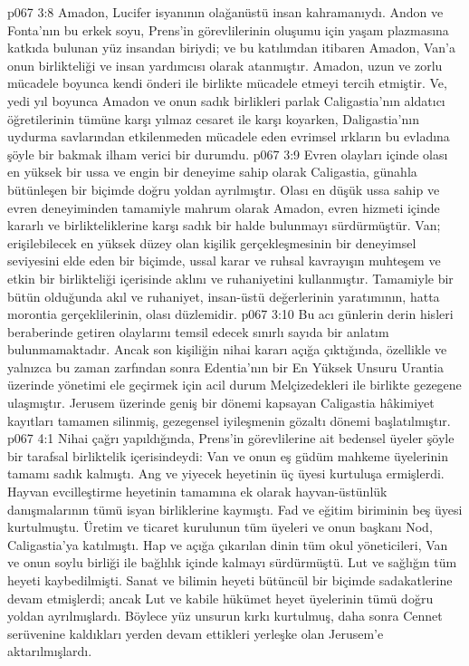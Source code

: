\vs p067 3:8 Amadon, Lucifer isyanının olağanüstü insan kahramanıydı. Andon ve Fonta’nın bu erkek soyu, Prens’in görevlilerinin oluşumu için yaşam plazmasına katkıda bulunan yüz insandan biriydi; ve bu katılımdan itibaren Amadon, Van’a onun birlikteliği ve insan yardımcısı olarak atanmıştır. Amadon, uzun ve zorlu mücadele boyunca kendi önderi ile birlikte mücadele etmeyi tercih etmiştir. Ve, yedi yıl boyunca Amadon ve onun sadık birlikleri parlak Caligastia’nın aldatıcı öğretilerinin tümüne karşı yılmaz cesaret ile karşı koyarken, Daligastia’nın uydurma savlarından etkilenmeden mücadele eden evrimsel ırkların bu evladına şöyle bir bakmak ilham verici bir durumdu.
\vs p067 3:9 Evren olayları içinde olası en yüksek bir ussa ve engin bir deneyime sahip olarak Caligastia, günahla bütünleşen bir biçimde doğru yoldan ayrılmıştır. Olası en düşük ussa sahip ve evren deneyiminden tamamiyle mahrum olarak Amadon, evren hizmeti içinde kararlı ve birlikteliklerine karşı sadık bir halde bulunmayı sürdürmüştür. Van; erişilebilecek en yüksek düzey olan kişilik gerçekleşmesinin bir deneyimsel seviyesini elde eden bir biçimde, ussal karar ve ruhsal kavrayışın muhteşem ve etkin bir birlikteliği içerisinde aklını ve ruhaniyetini kullanmıştır. Tamamiyle bir bütün olduğunda akıl ve ruhaniyet, insan\hyp{}üstü değerlerinin yaratımının, hatta morontia gerçeklilerinin, olası düzlemidir.
\vs p067 3:10 Bu acı günlerin derin hisleri beraberinde getiren olaylarını temsil edecek sınırlı sayıda bir anlatım bulunmamaktadır. Ancak son kişiliğin nihai kararı açığa çıktığında, özellikle ve yalnızca bu zaman zarfından sonra Edentia’nın bir En Yüksek Unsuru Urantia üzerinde yönetimi ele geçirmek için acil durum Melçizedekleri ile birlikte gezegene ulaşmıştır. Jerusem üzerinde geniş bir dönemi kapsayan Caligastia hâkimiyet kayıtları tamamen silinmiş, gezegensel iyileşmenin gözaltı dönemi başlatılmıştır.
\vs p067 4:1 Nihai çağrı yapıldığında, Prens’in görevlilerine ait bedensel üyeler şöyle bir tarafsal birliktelik içerisindeydi: Van ve onun eş güdüm mahkeme üyelerinin tamamı sadık kalmıştı. Ang ve yiyecek heyetinin üç üyesi kurtuluşa ermişlerdi. Hayvan evcilleştirme heyetinin tamamına ek olarak hayvan\hyp{}üstünlük danışmalarının tümü isyan birliklerine kaymıştı. Fad ve eğitim biriminin beş üyesi kurtulmuştu. Üretim ve ticaret kurulunun tüm üyeleri ve onun başkanı Nod, Caligastia’ya katılmıştı. Hap ve açığa çıkarılan dinin tüm okul yöneticileri, Van ve onun soylu birliği ile bağlılık içinde kalmayı sürdürmüştü. Lut ve sağlığın tüm heyeti kaybedilmişti. Sanat ve bilimin heyeti bütüncül bir biçimde sadakatlerine devam etmişlerdi; ancak Lut ve kabile hükümet heyet üyelerinin tümü doğru yoldan ayrılmışlardı. Böylece yüz unsurun kırkı kurtulmuş, daha sonra Cennet serüvenine kaldıkları yerden devam ettikleri yerleşke olan Jerusem’e aktarılmışlardı.
